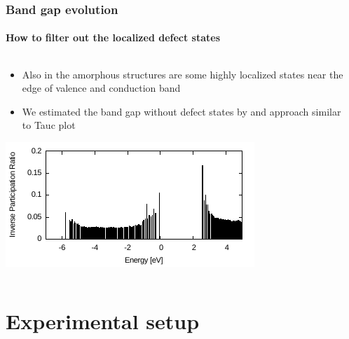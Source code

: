 \documentclass[noamsthm,8pt,t]{beamer}
\begin{document}
\begin{frame}
   \frametitle{Band gap evolution}
   \framesubtitle{How to filter out the localized defect states}

   \begin{columns}
      \begin{column}{0.5\textwidth}
         \begin{itemize}
            \item Also in the amorphous structures are some highly localized states near the edge of valence and conduction band
            \item<2> We estimated the band gap without defect states by and approach similar to Tauc plot
         \end{itemize}

         \includegraphics[width=\linewidth]{figures/IPR2.pdf}

      \end{column}
      \begin{column}{0.5\textwidth}
      \end{column}
   \end{columns}
\end{frame}

\section{Experimental setup}
\end{document}
